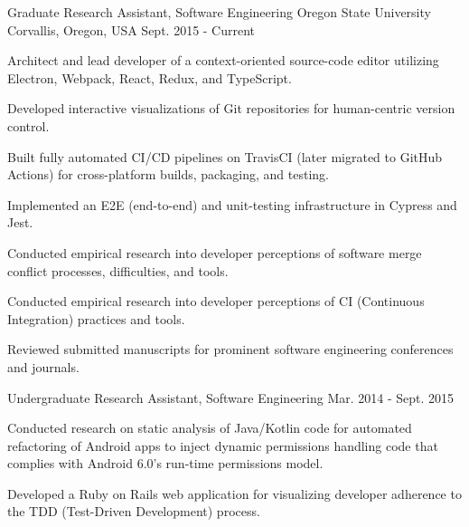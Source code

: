 

\begin{cventries}

  \cventry
    {Graduate Research Assistant, Software Engineering} %
    {Oregon State University} %
    {Corvallis, Oregon, USA} %
    {Sept. 2015 - Current} %
    {
      \begin{cvitems} %
        \item {Architect and lead developer of a context-oriented source-code editor utilizing Electron, Webpack, React, Redux, and TypeScript.}
        \item {Developed interactive visualizations of Git repositories for human-centric version control.}
        \item {Built fully automated CI/CD pipelines on TravisCI (later migrated to GitHub Actions) for cross-platform builds, packaging, and testing.}
        \item {Implemented an E2E (end-to-end) and unit-testing infrastructure in Cypress and Jest.}
        \item {Conducted empirical research into developer perceptions of software merge conflict processes, difficulties, and tools.}
        \item {Conducted empirical research into developer perceptions of CI (Continuous Integration) practices and tools.}
        \item {Reviewed submitted manuscripts for prominent software engineering conferences and journals.}
      \end{cvitems}
    }

  \cventry
    {Undergraduate Research Assistant, Software Engineering} %
    {} %
    {} %
    {Mar. 2014 - Sept. 2015} %
    {
      \begin{cvitems} %
        \item {Conducted research on static analysis of Java/Kotlin code for automated refactoring of Android apps to inject dynamic permissions handling code that complies with Android 6.0's run-time permissions model.}
        \item {Developed a Ruby on Rails web application for visualizing developer adherence to the TDD (Test-Driven Development) process.}
      \end{cvitems}
    }


\end{cventries}
